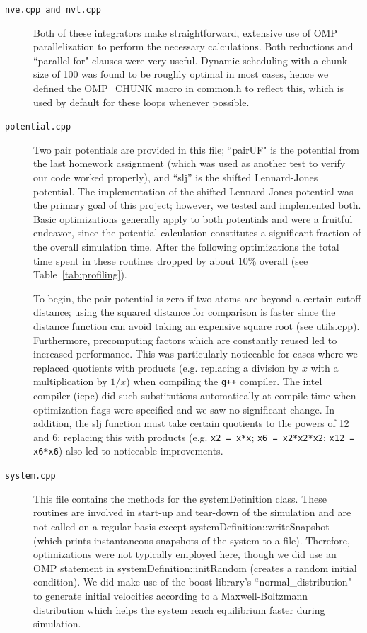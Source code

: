 \documentclass[12pt]{article}
\begin{document}
\begin{description}

\item[\texttt{nve.cpp and nvt.cpp}]
Both of these integrators make straightforward, extensive use of OMP parallelization to perform the necessary calculations.  Both reductions and ``parallel for" clauses were very useful.  Dynamic scheduling with a chunk size of 100 was found to be roughly optimal in most cases, hence we defined the OMP\_CHUNK macro in common.h to reflect this, which is used by default for these loops whenever possible.

\item[\texttt{potential.cpp}]
Two pair potentials are provided in this file; ``pairUF" is the potential from the last homework assignment (which was used as another test to verify our code worked properly), and ``slj'' is the shifted Lennard-Jones potential.  The implementation of the shifted Lennard-Jones potential was the primary goal of this project; however, we tested and implemented both.  Basic optimizations generally apply to both potentials and were a fruitful endeavor, since the potential calculation constitutes a significant fraction of the overall simulation time.  After the following optimizations the total time spent in these routines dropped by about 10\% overall (see Table~\ref{tab:profiling}).

To begin, the pair potential is zero if two atoms are beyond a certain cutoff distance; using the squared distance for comparison is faster since the distance function can avoid taking an expensive square root (see utils.cpp).  Furthermore, precomputing factors which are constantly reused led to increased performance.  This was particularly noticeable for cases where we replaced quotients with products (e.g. replacing a division by $x$ with a multiplication by $1/x$) when compiling the \texttt{g++} compiler.  The intel compiler (icpc) did such substitutions automatically at compile-time when optimization flags were specified and we saw no significant change.  In addition, the slj function must take certain quotients to the powers of 12 and 6; replacing this with products (e.g. \texttt{x2 = x*x}; \texttt{x6 = x2*x2*x2}; \texttt{x12 = x6*x6}) also led to noticeable improvements.

\item[\texttt{system.cpp}]
This file contains the methods for the systemDefinition class.  These routines are involved in start-up and tear-down of the simulation and are not called on a regular basis except systemDefinition::writeSnapshot (which prints instantaneous snapshots of the system to a file).  Therefore, optimizations were not typically employed here, though we did use an OMP statement in systemDefinition::initRandom (creates a random initial condition).  We did make use of the boost library's ``normal\_distribution" to generate initial velocities according to a Maxwell-Boltzmann distribution which helps the system reach equilibrium faster during simulation.


\end{description}
\end{document}

